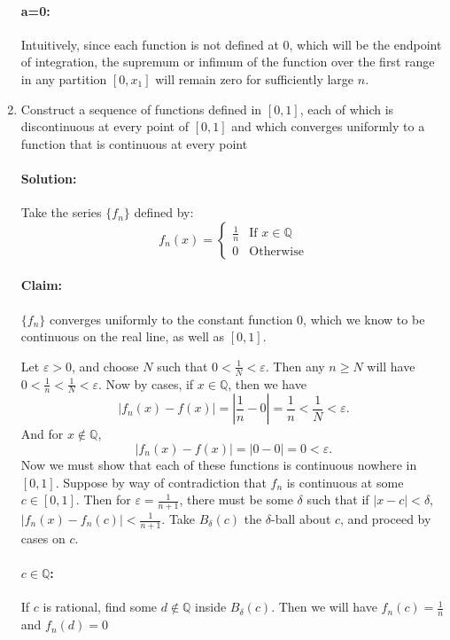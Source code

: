 \documentclass{article}
\begin{document}
\begin{enumerate}
  \paragraph{a=0:} Intuitively, since each function is not defined at 0, which will be the endpoint of integration, the supremum or infimum of the function over the first range in any partition $[0,x_1]$ will remain zero for sufficiently large $n$. 

  \newpage 
\item Construct a sequence of functions defined in $[0,1]$, each of which is discontinuous at every point of $[0,1]$ and which converges uniformly to a function that is continuous at every point 

  \paragraph{Solution: }Take the series $\{f_n\} $ defined by:
  \[
    f_n(x)=\begin{cases}
      \frac{1}{n}&\text{If } x\in \mathbb{Q}\\
      0&\text{Otherwise}
    \end{cases}
  \] 
  \paragraph{Claim:}  $\{f_n\} $ converges uniformly to the constant function $0$, which we know to be continuous on the real line, as well as $[0,1]$. 

  Let $\varepsilon>0$, and choose $N$ such that $0<\frac{1}{N}<\varepsilon$.
  Then any $n\geq N$ will have $0<\frac{1}{n}<\frac{1}{N}<\varepsilon$. Now by cases, if $x\in \mathbb{Q}$, then we have 
  \[
  |f_n(x)-f(x)|=\left|\frac{1}{n}-0\right|=\frac{1}{n}<\frac{1}{N}<\varepsilon
  .\] 
  And for $x\not\in \mathbb{Q}$, 
\[
  |f_n(x)-f(x)|=\left|0-0\right|=0<\varepsilon
.\] 
Now we must show that each of these functions is continuous nowhere in $[0,1]$.  Suppose by way of contradiction that $f_n$ is continuous at some $c\in [0,1]$. Then for $\varepsilon=\frac{1}{n+1}$, there must be some $\delta$ such that if $|x-c|<\delta$, $|f_n(x)-f_n(c)|<\frac{1}{n+1}$. Take $B_\delta(c)$ the $\delta$-ball about $c$, and proceed by cases on $c$.
\paragraph{$c\in \mathbb{Q}$:} If $c$ is rational, find some $d\not\in\mathbb{Q} $ inside $B_{\delta}(c)$. Then we will have $f_n(c)=\frac{1}{n}$ and $f_n(d)=0$

\end{enumerate}
\end{document}

